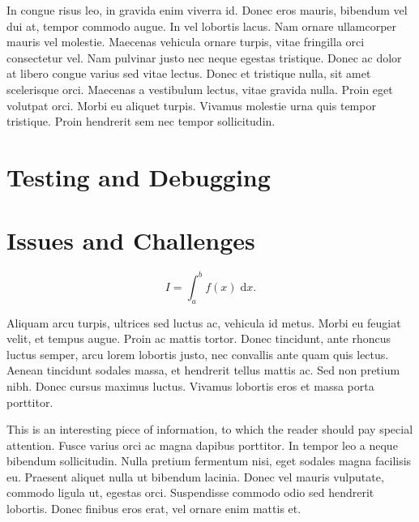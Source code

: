 \documentclass{article}
\begin{document}
\begin{warn}[Notice:]
  In congue risus leo, in gravida enim viverra id. Donec eros mauris, bibendum vel dui at, tempor commodo augue. In vel lobortis lacus. Nam ornare ullamcorper mauris vel molestie. Maecenas vehicula ornare turpis, vitae fringilla orci consectetur vel. Nam pulvinar justo nec neque egestas tristique. Donec ac dolor at libero congue varius sed vitae lectus. Donec et tristique nulla, sit amet scelerisque orci. Maecenas a vestibulum lectus, vitae gravida nulla. Proin eget volutpat orci. Morbi eu aliquet turpis. Vivamus molestie urna quis tempor tristique. Proin hendrerit sem nec tempor sollicitudin.
\end{warn}





\section{Testing and Debugging}



\section{Issues and Challenges}






\begin{equation}
	I = \int_{a}^{b} f(x) \; \text{d}x.
\end{equation}

Aliquam arcu turpis, ultrices sed luctus ac, vehicula id metus. Morbi eu feugiat velit, et tempus augue. Proin ac mattis tortor. Donec tincidunt, ante rhoncus luctus semper, arcu lorem lobortis justo, nec convallis ante quam quis lectus. Aenean tincidunt sodales massa, et hendrerit tellus mattis ac. Sed non pretium nibh. Donec cursus maximus luctus. Vivamus lobortis eros et massa porta porttitor.

\begin{info} %
	This is an interesting piece of information, to which the reader should pay special attention. Fusce varius orci ac magna dapibus porttitor. In tempor leo a neque bibendum sollicitudin. Nulla pretium fermentum nisi, eget sodales magna facilisis eu. Praesent aliquet nulla ut bibendum lacinia. Donec vel mauris vulputate, commodo ligula ut, egestas orci. Suspendisse commodo odio sed hendrerit lobortis. Donec finibus eros erat, vel ornare enim mattis et.
\end{info}
\end{document}
